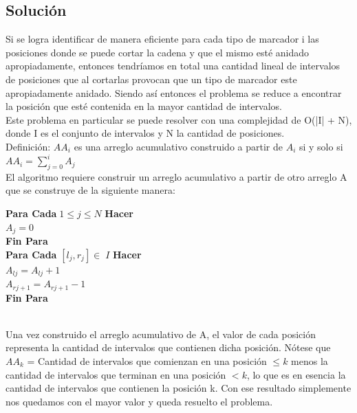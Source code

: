 \documentclass{report}
\begin{document}
\subsection{Soluci\'on}
Si se logra identificar de manera eficiente para cada tipo de marcador i las posiciones donde se puede cortar la cadena y que el mismo est\'e anidado apropiadamente, entonces tendr\'iamos en total una cantidad lineal de intervalos de posiciones que al cortarlas provocan que un tipo de marcador este apropiadamente anidado. Siendo as\'i entonces el problema se reduce a encontrar la posici\'on que est\'e contenida en la mayor cantidad de intervalos.\\
Este problema en particular se puede resolver con una complejidad de O(|I| + N), donde I es el conjunto de intervalos y N la cantidad de posiciones.\\ 
Definici\'on: ${AA}_i$ es una arreglo acumulativo construido a partir de $A_i$ si y solo si ${AA}_i = \sum_{j=0}^{i} A_j$\\
El algoritmo requiere construir un arreglo acumulativo a partir de otro arreglo A que se construye de la siguiente manera:\\
\begin{algorithm}
	{\bf Para Cada}$\;1 \leq j \leq N$ {\bf Hacer}\\ 
     \hspace{1cm}$ A_j = 0$\\
	{\bf Fin Para} \\
	{\bf Para Cada} $[l_j, r_j] \in \; I$ {\bf Hacer}\\
	\hspace{1cm}$A_{lj} = A_{lj} + 1$\\
	\hspace{1cm}$A_{rj + 1} = A_{rj + 1} - 1$\\
	{\bf Fin Para} \\
\end{algorithm}\\
Una vez construido el arreglo acumulativo de A, el valor de cada posici\'on representa la cantidad de intervalos que contienen dicha posici\'on. N\'otese que $AA_k$ = Cantidad de intervalos que comienzan en una posici\'on $\leq k$ menos la cantidad de intervalos que terminan en una posici\'on $<k$, lo que es en esencia
la cantidad de intervalos que contienen la posici\'on k. Con ese resultado simplemente nos quedamos con el mayor valor y queda resuelto el problema.\\
\end{document}
